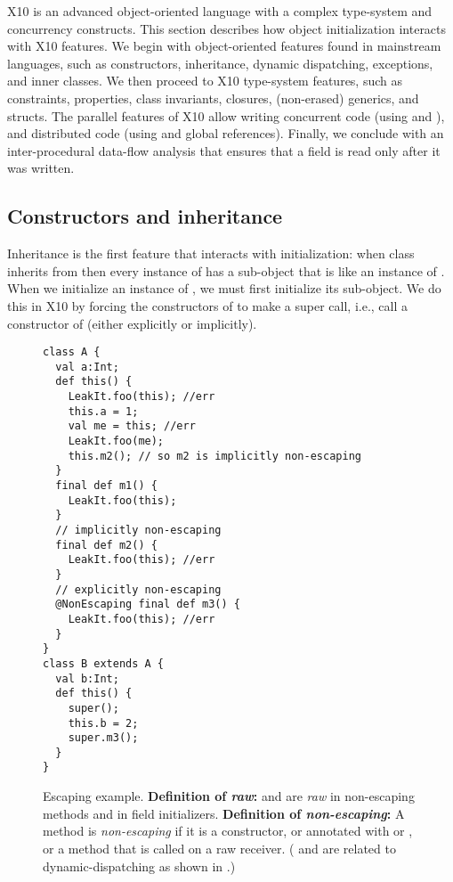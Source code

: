 X10 is an advanced object-oriented language with a complex type-system
    and concurrency constructs.
This section describes how object initialization interacts with X10 features.
We begin with object-oriented features found in mainstream languages,
    such as constructors, inheritance, dynamic dispatching, exceptions, and inner classes.
We then proceed to X10 type-system features,
    such as constraints, properties, class invariants, closures, (non-erased) generics, and structs.
The parallel features of X10 allow writing concurrent code (using  and ),
    and distributed code (using  and global references).
Finally, we conclude with an inter-procedural data-flow analysis that ensures that
    a field is read only after it was written.


\subsection{Constructors and inheritance}
Inheritance is the first feature that interacts with initialization:
    when class  inherits from 
    then every instance of  has a sub-object that is like an instance of .
When we initialize an instance of , we must first initialize its  sub-object.
We do this in X10 by forcing the constructors of  to make a super call,
    i.e., call a constructor of 
    (either explicitly or implicitly).



\begin{figure}
\begin{lstlisting}
class A {
  val a:Int;
  def this() {
    LeakIt.foo(this); //err
    this.a = 1;
    val me = this; //err
    LeakIt.foo(me);
    this.m2(); // so m2 is implicitly non-escaping
  }
  final def m1() {
    LeakIt.foo(this);
  }
  // implicitly non-escaping
  final def m2() {
    LeakIt.foo(this); //err
  }
  // explicitly non-escaping
  @NonEscaping final def m3() {
    LeakIt.foo(this); //err
  }
}
class B extends A {
  val b:Int;
  def this() {
    super();
    this.b = 2;
    super.m3();
  }
}
\end{lstlisting}
\caption{Escaping \this example.
    \textbf{Definition of \emph{raw}:}
    {\this and  are \emph{raw} in {non-escaping} methods and in field initializers}.
    \textbf{Definition of \emph{non-escaping}:}
        {A method is \emph{non-escaping} if it is a constructor,
            or annotated with  or ,
            or a method that is called on a raw \this receiver}.
    ( and  are related
        to dynamic-dispatching as shown in .)}
\label{Figure:Escaping-this}
\end{figure}

